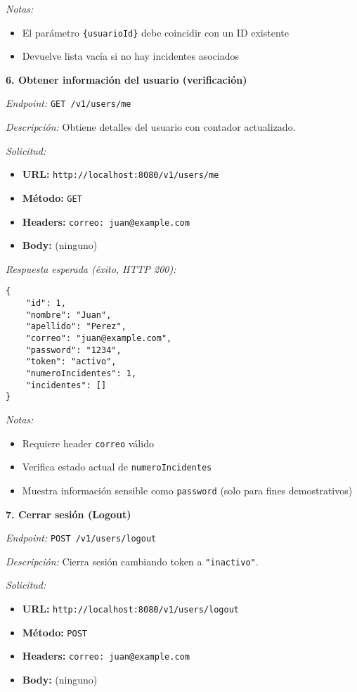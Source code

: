 \textit{Notas:}
\begin{itemize}
    \item El parámetro \texttt{\{usuarioId\}} debe coincidir con un ID existente
    \item Devuelve lista vacía si no hay incidentes asociados
\end{itemize}

\textbf{6. Obtener información del usuario (verificación)}

\textit{Endpoint:} \texttt{GET /v1/users/me}

\textit{Descripción:} Obtiene detalles del usuario con contador actualizado.

\textit{Solicitud:}
\begin{itemize}
    \item \textbf{URL:} \texttt{http://localhost:8080/v1/users/me}
    \item \textbf{Método:} \texttt{GET}
    \item \textbf{Headers:} \texttt{correo: juan@example.com}
    \item \textbf{Body:} (ninguno)
\end{itemize}

\textit{Respuesta esperada (éxito, HTTP 200):}
\begin{lstlisting}
{
    "id": 1,
    "nombre": "Juan",
    "apellido": "Perez",
    "correo": "juan@example.com",
    "password": "1234",
    "token": "activo",
    "numeroIncidentes": 1,
    "incidentes": []
}
\end{lstlisting}

\textit{Notas:}
\begin{itemize}
    \item Requiere header \texttt{correo} válido
    \item Verifica estado actual de \texttt{numeroIncidentes}
    \item Muestra información sensible como \texttt{password} (solo para fines demostrativos)
\end{itemize}

\textbf{7. Cerrar sesión (Logout)}

\textit{Endpoint:} \texttt{POST /v1/users/logout}

\textit{Descripción:} Cierra sesión cambiando token a \texttt{"inactivo"}.

\textit{Solicitud:}
\begin{itemize}
    \item \textbf{URL:} \texttt{http://localhost:8080/v1/users/logout}
    \item \textbf{Método:} \texttt{POST}
    \item \textbf{Headers:} \texttt{correo: juan@example.com}
    \item \textbf{Body:} (ninguno)
\end{itemize}

